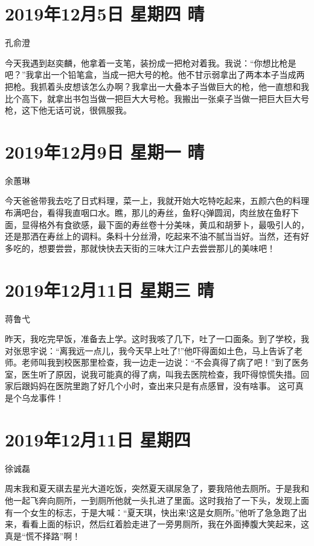 \section{2019年12月5日 星期四 晴}

孔俞澄

今天我遇到赵奕麟，他拿着一支笔，装扮成一把枪对着我。我说：“你想比枪是吧？”我拿出一个铅笔盒，当成一把大号的枪。他不甘示弱拿出了两本本子当成两把枪。我抓着头皮想该怎么办啊？我拿出一大叠本子当做巨大的枪，他一直想和我比个高下，就拿出书包当做一把巨大大号枪。我搬出一张桌子当做一把巨大巨大号枪，这下他无话可说，很佩服我。

\section{2019年12月9日 星期一 晴}

余蕙琳

今天爸爸带我去吃了日式料理，菜一上，我就开始大吃特吃起来，五颜六色的料理布满吧台，看得我直咽口水。瞧，那儿的寿丝，鱼籽Q弹圆润，肉丝放在鱼籽下面，显得格外有食欲感，最下面的寿丝卷十分美味，黄瓜和胡萝卜，最吸引人的，还是那洒在寿丝上的调料。条料十分丝滑，吃起来不油不腻当当好。当然，还有好多吃的，想要尝尝，那就快快去天街的三味大江户去尝尝那儿的美味吧！

\section{2019年12月11日 星期三 晴}

蒋鲁弋

昨天，我吃完早饭，准备去上学。这时我咳了几下，吐了一口面条。到了学校，我对张思宇说：“离我远一点儿，我今天早上吐了!”他吓得面如土色，马上告诉了老师。老师叫我到校医那里检查，我一边走一边说：“不会真得了病了吧！”到了医务室，医生听了原因，说我可能真的得了病，叫我去医院检查，我吓得惊慌失措。回家后跟妈妈在医院里跑了好几个小时，查出来只是有点感冒，没有啥事。
这可真是个乌龙事件！

\section{2019年12月11日 星期四}

徐诚磊

周末我和夏天祺去星光大道吃饭，突然夏天祺尿急了，要我陪他去厕所。于是我和他一起飞奔向厕所，一到厕所他就一头扎进了里面。这时我抬了一下头，发现上面有一个女生的标志，于是大喊：“夏天琪，快出来!这是女厕所。”他听了急急跑了出来，看看上面的标识，然后红着脸走进了一旁男厕所，我在外面捧腹大笑起来，这真是“慌不择路”啊！

